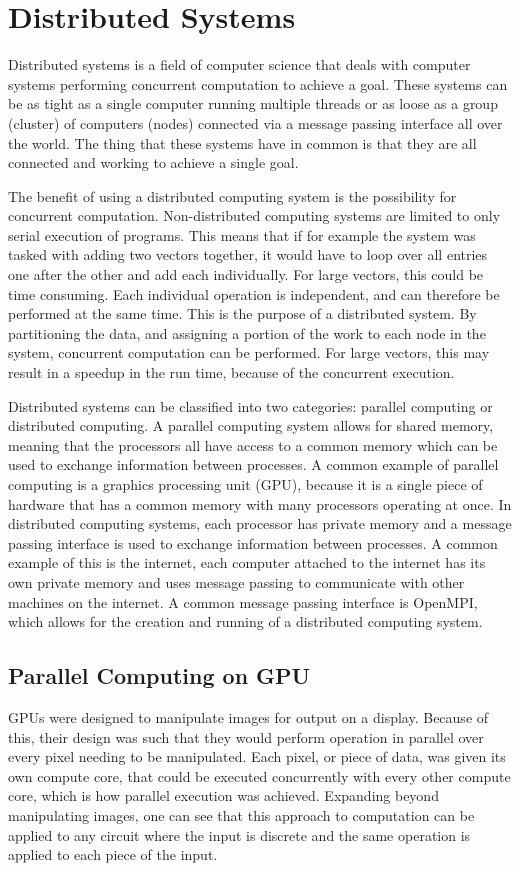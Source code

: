 \section{Distributed Systems}
Distributed systems is a field of computer science that deals with computer systems performing concurrent computation to achieve a goal. These systems can be as tight as a single computer running multiple threads or as loose as a group (cluster) of computers (nodes) connected via a message passing interface all over the world. The thing that these systems have in common is that they are all connected and working to achieve a single goal.

The benefit of using a distributed computing system is the possibility for concurrent computation. Non-distributed computing systems are limited to only serial execution of programs. This means that if for example the system was tasked with adding two vectors together, it would have to loop over all entries one after the other and add each individually. For large vectors, this could be time consuming. Each individual operation is independent, and can therefore be performed at the same time. This is the purpose of a distributed system. By partitioning the data, and assigning a portion of the work to each node in the system, concurrent computation can be performed. For large vectors, this may result in a speedup in the run time, because of the concurrent execution.

Distributed systems can be classified into two categories: parallel computing or distributed computing. A parallel computing system allows for shared memory, meaning that the processors all have access to a common memory which can be used to exchange information between processes. A common example of parallel computing is a graphics processing unit (GPU), because it is a single piece of hardware that has a common memory with many processors operating at once. In distributed computing systems, each processor has private memory and a message passing interface is used to exchange information between processes. A common example of this is the internet, each computer attached to the internet has its own private memory and uses message passing to communicate with other machines on the internet. A common message passing interface is OpenMPI, which allows for the creation and running of a distributed computing system.

\subsection{Parallel Computing on GPU}
GPUs were designed to manipulate images for output on a display. Because of this, their design was such that they would perform operation in parallel over every pixel needing to be manipulated. Each pixel, or piece of data, was given its own compute core, that could be executed concurrently with every other compute core, which is how parallel execution was achieved. Expanding beyond manipulating images, one can see that this approach to computation can be applied to any circuit where the input is discrete and the same operation is applied to each piece of the input. 

